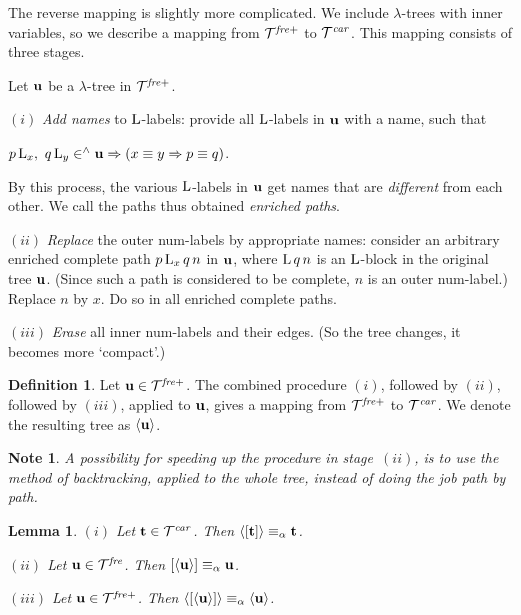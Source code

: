 \documentclass{article}
\theoremstyle{plain}
\newtheorem{Lem}[The]{Lemma}
\newtheorem{Note}[The]{Note}
\theoremstyle{definition}
\newtheorem{Def}[The]{Definition}
\begin{document}
{The reverse mapping is slightly more complicated. We include $\lambda$-trees with inner variables, so we describe a mapping from ${\cal T}^{\it fre+}$ to ${\cal T}^{\it car}$. This mapping consists of three stages.

\smallskip

Let ${\bf u}$ be a $\lambda$-tree in ${\cal T}^{\it fre+}$.

\smallskip

$(i)$ {\it Add names\/} to ${\rm L}$-labels: provide all ${\rm L}$-labels in ${\bf u}$ with a name, such that

\smallskip

$p \, {\rm L}_x,~ q \, {\rm L}_y \in^\wedge {\bf u} \Rightarrow (x \equiv y \Rightarrow p \equiv q)$.

\smallskip

By this process, the various ${\rm L}$-labels in ${\bf u}$ get names that are {\it different\/} from each other. We call the paths thus obtained {\it enriched paths\/}.

$(ii)$ {\it Replace\/} the outer num-labels by appropriate names: consider an arbitrary enriched complete path $p \, {\rm L}_x \, q \, n$ in ${\bf u}$, where ${\rm L} \, q \, n$ is an ${\rm L}$-block in the original tree ${\bf u}$. (Since such a path is considered to be complete, $n$ is an outer num-label.) Replace $n$ by $x$. Do so in all enriched complete paths.

$(iii)$ {\it Erase\/} all inner num-labels and their edges. (So the tree changes, it becomes more `compact'.)

\begin{Def} Let ${\bf u} \in {\cal T}^{\it fre+}$. The combined procedure $(i)$, followed by $(ii)$, followed by $(iii)$, applied to ${\bf u}$, gives a mapping from ${\cal T}^{\it fre+}$ to ${\cal T}^{\it car}$. We denote the resulting tree as $\langle {\bf u} \rangle$.
\end{Def}

\begin{Note} A possibility for speeding up the procedure in stage~$(ii)$, is to use the method of {\em backtracking\/}, applied to the whole tree, instead of doing the job path by path.
\end{Note}

\begin{Lem}\label{LemIde} $(i)$ Let ${\bf t} \in {\cal T}^{\it car}$. Then $\langle [ {\bf t} ] \rangle \equiv_{\alpha} {\bf t}$.

$(ii)$ Let ${\bf u} \in {\cal T}^{\it fre}$. Then $[ \langle {\bf u} \rangle ] \equiv_{\alpha} {\bf u}$.

$(iii)$ Let ${\bf u} \in {\cal T}^{\it fre+}$. Then $\langle [ \langle {\bf u} \rangle ] \rangle \equiv_{\alpha} \langle {\bf u} \rangle$.
\end{Lem}



}
\end{document}
